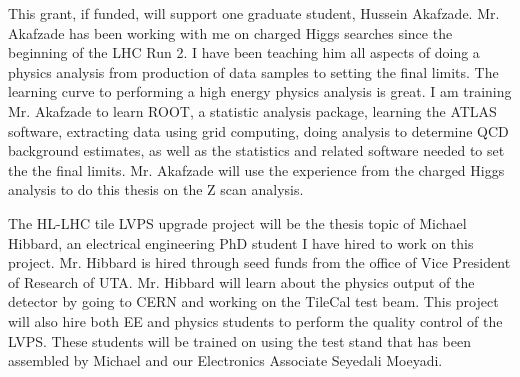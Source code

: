 \documentclass[11pt]{article}
\begin{document}
This grant, if funded, will support one graduate student, Hussein Akafzade.  Mr. Akafzade has been working with me on charged Higgs searches since the beginning of the LHC Run 2.
I have been teaching him all aspects of doing a physics analysis from production of data samples to setting the final limits.  The learning curve to performing a high energy physics analysis is great.  I am training Mr. Akafzade
to learn ROOT, a statistic analysis package, learning the ATLAS software, extracting data using grid computing, doing analysis to determine QCD background estimates, as well as the statistics and related software needed
to set the the final limits.  Mr. Akafzade will use the experience from the charged Higgs analysis to do this thesis on the Z scan analysis.

The HL-LHC tile LVPS upgrade project will be the thesis topic of Michael Hibbard, an electrical engineering PhD student I have hired to work on this project.  Mr. Hibbard is hired 
through seed funds from the office of Vice President of Research of UTA.  Mr. Hibbard will learn about the physics output of the detector by going to CERN and working on the TileCal test beam.
This project will also hire both EE and physics students to perform the quality control of the LVPS. These students will be trained on using the test stand that has been assembled by Michael and our Electronics Associate Seyedali Moeyadi.





%
\end{document}
